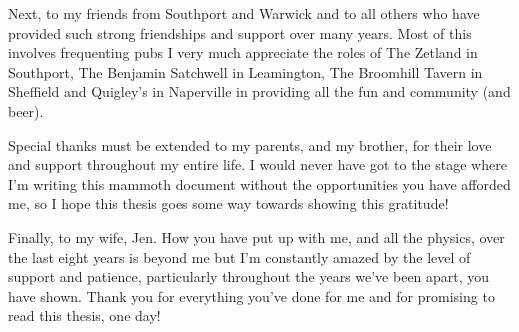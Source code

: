 \begin{acknowledgements}
  Next, to my friends from Southport and Warwick and to all others who have provided such strong friendships and support over many years.  Most of this involves frequenting pubs I very much appreciate the roles of The Zetland in Southport, The Benjamin Satchwell in Leamington, The Broomhill Tavern in Sheffield and Quigley's in Naperville in providing all the fun and community (and beer).

  Special thanks must be extended to my parents, and my brother, for their love and support throughout my entire life.  I would never have got to the stage where I'm writing this mammoth document without the opportunities you have afforded me, so I hope this thesis goes some way towards showing this gratitude!

  Finally, to my wife, Jen.  How you have put up with me, and all the physics, over the last eight years is beyond me but I'm constantly amazed by the level of support and patience, particularly throughout the years we've been apart, you have shown.  Thank you for everything you've done for me and for promising to read this thesis, one day!











\end{acknowledgements}

